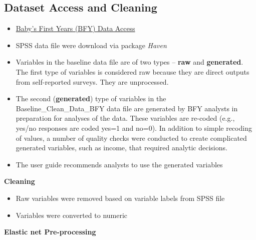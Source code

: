 \documentclass[sn-basic,pdflatex]{sn-jnl}
\providecommand{\tightlist}{%
  \setlength{\itemsep}{0pt}\setlength{\parskip}{0pt}}
\begin{document}
\subsection{Dataset Access and
Cleaning}\label{dataset-access-and-cleaning}

\begin{itemize}
\tightlist
\item
  \href{https://www.childandfamilydataarchive.org/cfda/archives/cfda/studies/37871/summary}{Baby's
  First Years (BFY) Data Access}
\item
  SPSS data file were download via package \emph{Haven}
\item
  Variables in the baseline data file are of two types -- \textbf{raw}
  and \textbf{generated}. The first type of variables is considered raw
  because they are direct outputs from self-reported surveys. They are
  unprocessed.
\item
  The second (\textbf{generated}) type of variables in the
  Baseline\_Clean\_Data\_BFY data file are generated by BFY analysts in
  preparation for analyses of the data. These variables are re-coded
  (e.g., yes/no responses are coded yes=1 and no=0). In addition to
  simple recoding of values, a number of quality checks were conducted
  to create complicated generated variables, such as income, that
  required analytic decisions.
\item
  The user guide recommends analysts to use the generated variables
\end{itemize}

\textbf{Cleaning}

\begin{itemize}
\tightlist
\item
  Raw variables were removed based on variable labels from SPSS file
\item
  Variables were converted to numeric
\end{itemize}

\textbf{Elastic net Pre-processing}
\end{document}
